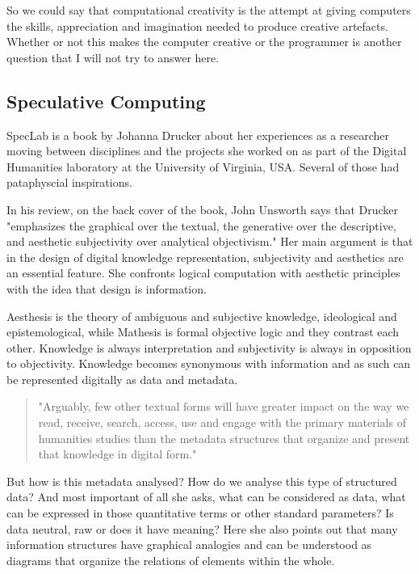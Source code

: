 So we could say that computational creativity is the attempt at giving computers the skills, appreciation and imagination needed to produce creative artefacts. Whether or not this makes the computer creative or the programmer is another question that I will not try to answer here.

\subsection{Speculative Computing}

SpecLab \citep{Drucker2009} is a book by Johanna Drucker about her experiences as a researcher moving between disciplines and the projects she worked on as part of the Digital Humanities laboratory at the University of Virginia, USA. Several of those had pataphyscial inspirations.

In his review, on the back cover of the book, John Unsworth says that Drucker "emphasizes the graphical over the textual, the generative over the descriptive, and aesthetic subjectivity over analytical objectivism." Her main argument is that in the design of digital knowledge representation, subjectivity and aesthetics are an essential feature. She confronts logical computation with aesthetic principles with the idea that design is information.

Aesthesis is the theory of ambiguous and subjective knowledge, ideological and epistemological, while Mathesis is formal objective logic and they contrast each other. Knowledge is always interpretation and subjectivity is always in opposition to objectivity. Knowledge becomes synonymous with information and as such can be represented digitally as data and metadata.

\begin{quote}
  "Arguably, few other textual forms will have greater impact on the way we read, receive, search, access, use and engage with the primary materials of humanities studies than the metadata structures that organize and present that knowledge in digital form." \citep[p.9]{Drucker2009}
\end{quote}

But how is this metadata analysed? How do we analyse this type of structured data? And most important of all she asks, what can be considered as data, what can be expressed in those quantitative terms or other standard parameters? Is data neutral, raw or does it have meaning? Here she also points out that many information structures have graphical analogies and can be understood as diagrams that organize the relations of elements within the whole.

